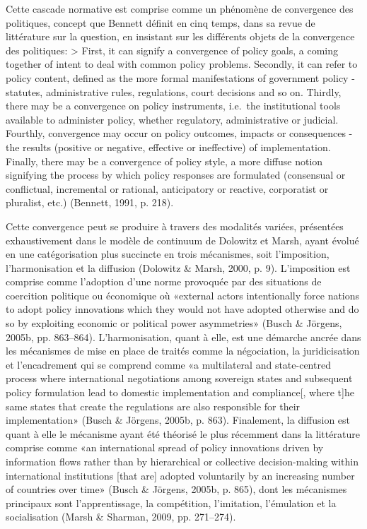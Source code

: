 \documentclass[12pt]{ulaval}
\begin{document}
Cette cascade normative est comprise comme un phénomène de convergence des politiques, concept que Bennett définit en cinq temps, dans sa revue de littérature sur la question, en insistant sur les différents objets de la convergence des politiques:
\textgreater{} First, it can signify a convergence of policy goals, a coming together of intent to deal with common policy problems. Secondly, it can refer to policy content, defined as the more formal manifestations of government policy - statutes, administrative rules, regulations, court decisions and so on. Thirdly, there may be a convergence on policy instruments, i.e.~the institutional tools available to administer policy, whether regulatory, administrative or judicial. Fourthly, convergence may occur on policy outcomes, impacts or consequences - the results (positive or negative, effective or ineffective) of implementation. Finally, there may be a convergence of policy style, a more diffuse notion signifying the process by which policy responses are formulated (consensual or conflictual, incremental or rational, anticipatory or reactive, corporatist or pluralist, etc.) (Bennett, 1991, p. 218).

Cette convergence peut se produire à travers des modalités variées, présentées exhaustivement dans le modèle de continuum de Dolowitz et Marsh, ayant évolué en une catégorisation plus succincte en trois mécanismes, soit l'imposition, l'harmonisation et la diffusion (Dolowitz \& Marsh, 2000, p. 9). L'imposition est comprise comme l'adoption d'une norme provoquée par des situations de coercition politique ou économique où «external actors intentionally force nations to adopt policy innovations which they would not have adopted otherwise and do so by exploiting economic or political power asymmetries» (Busch \& Jörgens, 2005b, pp. 863--864). L'harmonisation, quant à elle, est une démarche ancrée dans les mécanismes de mise en place de traités comme la négociation, la juridicisation et l'encadrement qui se comprend comme «a multilateral and state-centred process where international negotiations among sovereign states and subsequent policy formulation lead to domestic implementation and compliance{[}, where t{]}he same states that create the regulations are also responsible for their implementation» (Busch \& Jörgens, 2005b, p. 863). Finalement, la diffusion est quant à elle le mécanisme ayant été théorisé le plus récemment dans la littérature comprise comme «an international spread of policy innovations driven by information flows rather than by hierarchical or collective decision-making within international institutions {[}that are{]} adopted voluntarily by an increasing number of countries over time» (Busch \& Jörgens, 2005b, p. 865), dont les mécanismes principaux sont l'apprentissage, la compétition, l'imitation, l'émulation et la socialisation (Marsh \& Sharman, 2009, pp. 271--274).
\end{document}
